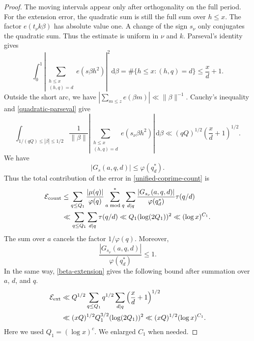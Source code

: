 \documentclass[10pt,a4paper]{amsart}
\newcommand{\dif}{\mathrm{d}}
\begin{document}
\begin{proof}
The moving intervals appear only after orthogonality on the full
period.  For the extension error, the quadratic sum is still the full
sum over $h\leq x$.  The factor $e(t_\nu k\beta)$ has absolute value
one.  A change of the sign $s_\nu$ only conjugates the quadratic sum.
Thus the estimate is uniform in $\nu$ and $k$.  Parseval's identity gives
\begin{equation}\label{quadratic-parseval}
 \int_0^1\left|
 \sum_{\substack{h\leq x\\(h,q)=d}}e(s\beta h^2)
 \right|^2\,\dif\beta
 =\#\{h\leq x:(h,q)=d\}\leq\frac xd+1.
\end{equation}
Outside the short arc, we have
$|\sum_{m\leq z}e(\beta m)|\ll\|\beta\|^{-1}$.  Cauchy's inequality
and \eqref{quadratic-parseval} give
\begin{equation}\label{beta-extension}
 \int_{1/(qQ)\leq|\beta|\leq1/2}
 \frac1{\|\beta\|}
 \left|\sum_{\substack{h\leq x\\(h,q)=d}}e(s_\nu\beta h^2)\right|
 \,\dif\beta
\ll(qQ)^{1/2}\left(\frac xd+1\right)^{1/2}.
\end{equation}
We have
\[
 |G_s(a,q,d)|\leq\varphi(q^*_{d}).
\]
Thus the total contribution of the error in
\eqref{unified-coprime-count} is
\begin{align*}
 \mathcal E_{\mathrm{count}}
 &\leq \sum_{q\leq Q_1}\frac{|\mu(q)|}{\varphi(q)}
       \sum_{a\bmod q}^{*}\sum_{d\mid q}
       \frac{|G_{s_\nu}(a,q,d)|}{\varphi(q^*_{d})}
       \tau(q/d)\notag\\
 &\ll \sum_{q\leq Q_1}\sum_{d\mid q}\tau(q/d)
 \ll Q_1(\log(2Q_1))^2
 \ll(\log x)^{C_1}.                            \label{counting-error-sum}
\end{align*}
The sum over $a$ cancels the factor $1/\varphi(q)$.  Moreover,
\[
 \frac{|G_{s_\nu}(a,q,d)|}{\varphi(q^*_{d})}\leq1.
\]
In the same way,
\eqref{beta-extension} gives the following bound after summation over
$a$, $d$, and $q$.
\begin{align}
 \mathcal E_{\mathrm{ext}}
 &\ll Q^{1/2}\sum_{q\leq Q_1}q^{1/2}
       \sum_{d\mid q}\left(\frac xd+1\right)^{1/2}\notag\\
 &\ll (xQ)^{1/2}Q_1^{3/2}(\log(2Q_1))^2
 \ll (xQ)^{1/2}(\log x)^{C_1}.                 \label{extension-error-sum}
\end{align}
Here we used $Q_1=(\log x)^c$.  We enlarged $C_1$ when needed.


\end{proof}
\end{document}
